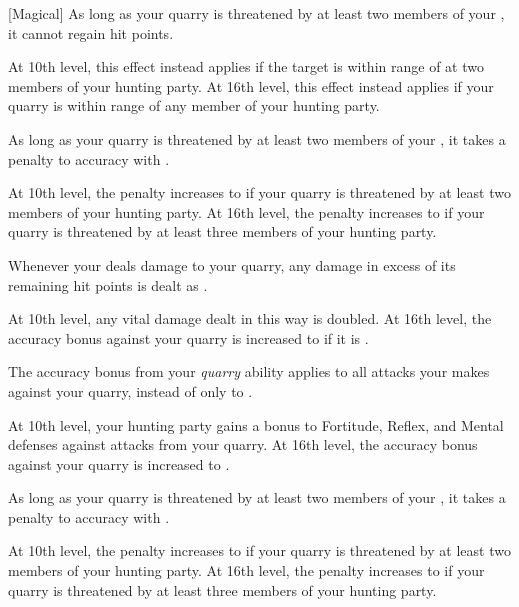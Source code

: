 {            [Magical]
            As long as your quarry is threatened by at least two members of your , it cannot regain hit points.
            \par At 10th level, this effect instead applies if the target is within \rngmed range of at two members of your hunting party.
            At 16th level, this effect instead applies if your quarry is within \rnglong range of any member of your hunting party.

            As long as your quarry is threatened by at least two members of your , it takes a  penalty to accuracy with .
            \par At 10th level, the penalty increases to  if your quarry is threatened by at least two members of your hunting party.
            At 16th level, the penalty increases to  if your quarry is threatened by at least three members of your hunting party.

            Whenever your  deals damage to your quarry, any damage in excess of its remaining hit points is dealt as .
            \par At 10th level, any vital damage dealt in this way is doubled.
            At 16th level, the accuracy bonus against your quarry is increased to  if it is .

            The accuracy bonus from your \textit{quarry} ability applies to all attacks your  makes against your quarry, instead of only to .
            \par At 10th level, your hunting party gains a  bonus to Fortitude, Reflex, and Mental defenses against attacks from your quarry.
            At 16th level, the accuracy bonus against your quarry is increased to .

            As long as your quarry is threatened by at least two members of your , it takes a  penalty to accuracy with .
            \par At 10th level, the penalty increases to  if your quarry is threatened by at least two members of your hunting party.
            At 16th level, the penalty increases to  if your quarry is threatened by at least three members of your hunting party.

}
